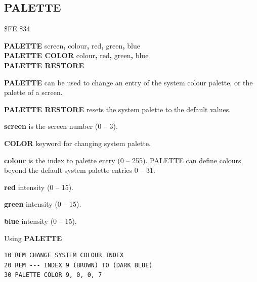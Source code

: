 
\newpage
\subsection{PALETTE}
\begin{description}[leftmargin=2cm,style=nextline]
\item [Token:]    \$FE \$34

\item [Format:]   {\bf PALETTE} screen{\bf,} colour{\bf,} red{\bf,} green{\bf,} blue \\
                  {\bf PALETTE COLOR} colour{\bf,} red{\bf,} green{\bf,} blue \\
                  {\bf PALETTE RESTORE}

\item [Usage:]    {\bf PALETTE} can be used to change an entry of the system colour palette, or the palette of a screen.
                 
                  {\bf PALETTE RESTORE} resets the system palette to the default values.

                  {\bf screen} is the screen number (0 -- 3).

                  {\bf COLOR} keyword for changing system palette.

                  {\bf colour} is the index to palette entry (0 -- 255). PALETTE can define colours beyond the default system palette entries 0 -- 31.

                  {\bf red} intensity (0 -- 15).

                  {\bf green} intensity (0 -- 15).

                  {\bf blue} intensity (0 -- 15).

\item [Examples:] Using {\bf PALETTE}

\begin{tcolorbox}[colback=black,coltext=white]
\verbatimfont{\codefont}
\begin{verbatim}
10 REM CHANGE SYSTEM COLOUR INDEX
20 REM --- INDEX 9 (BROWN) TO (DARK BLUE)
30 PALETTE COLOR 9, 0, 0, 7
\end{verbatim}
\end{tcolorbox}


\end{description}
